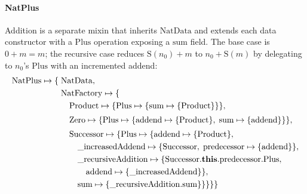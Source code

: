 \paragraph{NatPlus}
Addition is a separate mixin that inherits $\mathrm{NatData}$
and extends each data constructor with a $\mathrm{Plus}$ operation
exposing a $\mathrm{sum}$ field.
The base case is $0 + m = m$; the recursive case reduces
$\mathrm{S}(n_0) + m$ to $n_0 + \mathrm{S}(m)$
by delegating to $n_0$'s $\mathrm{Plus}$ with an incremented addend:
\begin{align*}
  \mathrm{NatPlus} \mapsto \{\;&
    \mathrm{NatData},\\
    &\mathrm{NatFactory} \mapsto \{\\
      &\quad \mathrm{Product} \mapsto \{\mathrm{Plus} \mapsto \{
      \mathrm{sum} \mapsto \{\mathrm{Product}\}\}\},\\[2pt]
      &\quad \mathrm{Zero} \mapsto \{\mathrm{Plus} \mapsto \{
          \mathrm{addend} \mapsto \{\mathrm{Product}\},\;
      \mathrm{sum} \mapsto \{\mathrm{addend}\}\}\},\\[2pt]
      &\quad \mathrm{Successor} \mapsto \{\mathrm{Plus} \mapsto \{
          \mathrm{addend} \mapsto \{\mathrm{Product}\},\\
          &\qquad
          \mathrm{\_increasedAddend} \mapsto \{
            \mathrm{Successor},\;
          \mathrm{predecessor} \mapsto \{\mathrm{addend}\}\},\\
          &\qquad
          \mathrm{\_recursiveAddition} \mapsto \{
            \mathrm{Successor}.\mathbf{this}.\mathrm{predecessor}.\mathrm{Plus},\\
            &\qquad\quad
          \mathrm{addend} \mapsto \{\mathrm{\_increasedAddend}\}\},\\
          &\qquad
          \mathrm{sum} \mapsto \{
  \mathrm{\_recursiveAddition}.\mathrm{sum}\}\}\}\}\}
\end{align*}

